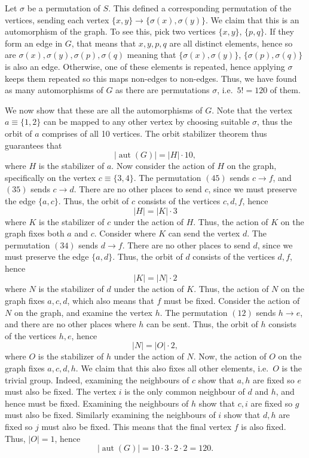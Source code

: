 \documentclass[10pt]{article}
\DeclareMathOperator{\aut}{aut}
\begin{document}
        Let $\sigma$ be a permutation of $S$. This defined a corresponding
        permutation of the vertices, sending each vertex $\{x, y\} \to \{\sigma(x),
        \sigma(y)\}$. We claim that this is an automorphism of the graph. To see
        this, pick two vertices $\{x, y\}$, $\{p, q\}$. If they form an edge in $G$,
        that means that $x, y, p, q$ are all distinct elements, hence so are
        $\sigma(x), \sigma(y), \sigma(p), \sigma(q)$ meaning that $\{\sigma(x),
        \sigma(y)\}$, $\{\sigma(p), \sigma(q)\}$ is also an edge. Otherwise, one of
        these elements is repeated, hence applying $\sigma$ keeps them repeated so
        this maps non-edges to non-edges. Thus, we have found as many automorphisms
        of $G$ as there are permutations $\sigma$, i.e.\ $5! = 120$ of them.

        We now show that these are all the automorphisms of $G$. Note that the
        vertex $a \equiv \{1, 2\}$ can be mapped to any other vertex by choosing
        suitable $\sigma$, thus the orbit of $a$ comprises of all 10 vertices. The
        orbit stabilizer theorem thus guarantees that \[
            |\aut(G)| = |H|\cdot 10,
        \] where $H$ is the stabilizer of $a$. Now consider the action of $H$ on the
        graph, specifically on the vertex $c \equiv \{3, 4\}$. The permutation $(45)$
        sends $c \to f$, and $(35)$ sends $c \to d$. There are no other places to
        send $c$, since we must preserve the edge $\{a, c\}$. Thus, the orbit of $c$
        consists of the vertices $c, d, f$, hence \[
            |H| = |K|\cdot 3
        \] where $K$ is the stabilizer of $c$ under the action of $H$. Thus, the
        action of $K$ on the graph fixes both $a$ and $c$. Consider where $K$
        can send the vertex $d$. The permutation $(34)$ sends $d \to f$. There are no
        other places to send $d$, since we must preserve the edge $\{a, d\}$. Thus,
        the orbit of $d$ consists of the vertices $d, f$, hence \[
            |K| = |N|\cdot 2
        \] where $N$ is the stabilizer of $d$ under the action of $K$. Thus, the
        action of $N$ on the graph fixes $a, c, d$, which also means that $f$ must be
        fixed. Consider the action of $N$ on the graph, and examine the vertex $h$.
        The permutation $(12)$ sends $h \to e$, and there are no other places where
        $h$ can be sent. Thus, the orbit of $h$ consists of the vertices $h, e$,
        hence \[
            |N| = |O|\cdot 2,
        \] where $O$ is the stabilizer of $h$ under the action of $N$. Now, the
        action of $O$ on the graph fixes $a, c, d, h$. We claim that this also
        fixes all other elements, i.e.\ $O$ is the trivial group. Indeed, examining
        the neighbours of $c$ show that $a, h$ are fixed so $e$ must also be fixed.
        The vertex $i$ is the only common neighbour of $d$ and $h$, and hence must be
        fixed. Examining the neighbours of $h$ show that $c, i$ are fixed so $g$ must
        also be fixed. Similarly examining the neighbours of $i$ show that $d, h$ are
        fixed so $j$ must also be fixed. This means that the final vertex $f$ is also
        fixed. Thus, $|O| = 1$, hence \[
            |\aut(G)| = 10\cdot 3\cdot 2\cdot 2 = 120.
        \] 
\end{document}
